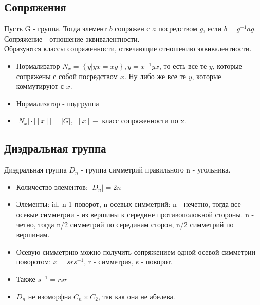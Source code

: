 \documentclass[11pt,a4paper]{article}
\begin{document}
			
		\subsection*{Сопряжения}  Пусть G - группа. Тогда элемент $b$ сопряжен с $a$ посредством $g$, если $b = g^{-1}ag$. Сопряжение - отношение эквивалентности.\\
		Образуются классы сопряженности, отвечающие отношению эквивалентности.
		\begin{itemize}
			\item Нормализатор $N_x = \left\{y| yx = xy\right\}, y = x^{-1}yx $, то есть все те $y$, которые сопряжены с собой посредством $x$. Ну либо же все те $y$, которые коммутируют с $x$.
			\item Нормализатор - подгруппа
			\item $|N_x| \cdot |\left[x\right]| = |G|, \ \ \left[x\right] - $ класс сопряженности по x.
		\end{itemize}

		
		\subsection*{ Диэдральная группа} Диэдральная группа $D_n$ - группа симметрий правильного n - угольника.
		\begin{itemize}
			\item Количество элементов: $|D_n| = 2n$
			\item Элементы: id, n-1 поворот, n осевых симметрий: n - нечетно, тогда все осевые симметрии - из вершины к середине противоположной стороны. n - четно, тогда n/2 симметрий по серединам сторон, n/2 симметрий по вершинам.
			
			\item Осевую симметрию можно получить сопряжением одной осевой симметрии поворотом: $x = srs^{-1}$, r - симметрия, s - поворот.
			\item Также $s^{-1} = rsr$
			\item $D_n$ не изоморфна $C_n \times C_2$, так как она не абелева.
		\end{itemize}
		
\end{document}
